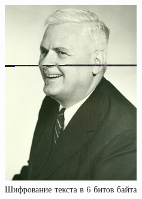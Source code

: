 \documentclass[10pt,a4paper,final]{article} %
\begin{document}
\begin{figure}[h!]
	\centering
	\begin{minipage}{0.3\textwidth}
		\centering
		\includegraphics[width=\linewidth]{img/Haskell_6 (1)}
		\caption{Шифрование текста в 6 битов байта}
	\end{minipage}
	\hspace{0.02\textwidth}
	\begin{minipage}{0.3\textwidth}
		\centering

\end{minipage}
\end{figure}
\end{document}
